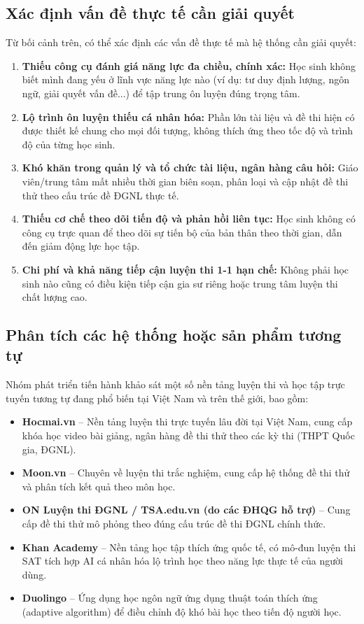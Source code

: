\documentclass[12pt,a4paper]{article}
\begin{document}
	\subsection{Xác định vấn đề thực tế cần giải quyết}
	
	Từ bối cảnh trên, có thể xác định các vấn đề thực tế mà hệ thống cần giải quyết:
	
	\begin{enumerate}[label=(\arabic*)]
		\item \textbf{Thiếu công cụ đánh giá năng lực đa chiều, chính xác:} Học sinh không biết mình đang yếu ở lĩnh vực năng lực nào (ví dụ: tư duy định lượng, ngôn ngữ, giải quyết vấn đề...) để tập trung ôn luyện đúng trọng tâm.
		\item \textbf{Lộ trình ôn luyện thiếu cá nhân hóa:} Phần lớn tài liệu và đề thi hiện có được thiết kế chung cho mọi đối tượng, không thích ứng theo tốc độ và trình độ của từng học sinh.
		\item \textbf{Khó khăn trong quản lý và tổ chức tài liệu, ngân hàng câu hỏi:} Giáo viên/trung tâm mất nhiều thời gian biên soạn, phân loại và cập nhật đề thi thử theo cấu trúc đề ĐGNL thực tế.
		\item \textbf{Thiếu cơ chế theo dõi tiến độ và phản hồi liên tục:} Học sinh không có công cụ trực quan để theo dõi sự tiến bộ của bản thân theo thời gian, dẫn đến giảm động lực học tập.
		\item \textbf{Chi phí và khả năng tiếp cận luyện thi 1-1 hạn chế:} Không phải học sinh nào cũng có điều kiện tiếp cận gia sư riêng hoặc trung tâm luyện thi chất lượng cao.
	\end{enumerate}
	
	\subsection{Phân tích các hệ thống hoặc sản phẩm tương tự}
	
	Nhóm phát triển tiến hành khảo sát một số nền tảng luyện thi và học tập trực tuyến tương tự đang phổ biến tại Việt Nam và trên thế giới, bao gồm:
	
	\begin{itemize}[nosep]
		\item \textbf{Hocmai.vn} -- Nền tảng luyện thi trực tuyến lâu đời tại Việt Nam, cung cấp khóa học video bài giảng, ngân hàng đề thi thử theo các kỳ thi (THPT Quốc gia, ĐGNL).
		\item \textbf{Moon.vn} -- Chuyên về luyện thi trắc nghiệm, cung cấp hệ thống đề thi thử và phân tích kết quả theo môn học.
		\item \textbf{ON Luyện thi ĐGNL / TSA.edu.vn (do các ĐHQG hỗ trợ)} -- Cung cấp đề thi thử mô phỏng theo đúng cấu trúc đề thi ĐGNL chính thức.
		\item \textbf{Khan Academy} -- Nền tảng học tập thích ứng quốc tế, có mô-đun luyện thi SAT tích hợp AI cá nhân hóa lộ trình học theo năng lực thực tế của người dùng.
		\item \textbf{Duolingo} -- Ứng dụng học ngôn ngữ ứng dụng thuật toán thích ứng (adaptive algorithm) để điều chỉnh độ khó bài học theo tiến độ người học.
	\end{itemize}
	
\end{document}
